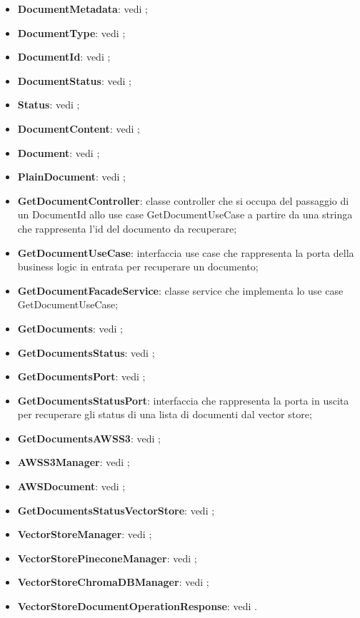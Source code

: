 \documentclass[10pt, a4paper]{article}
\begin{document}
\begin{itemize}
    \item \textbf{DocumentMetadata}: vedi ;
    \item \textbf{DocumentType}: vedi ;
    \item \textbf{DocumentId}: vedi ;
    \item \textbf{DocumentStatus}: vedi ;
    \item \textbf{Status}: vedi ;
    \item \textbf{DocumentContent}: vedi ;
    \item \textbf{Document}: vedi ;
    \item \textbf{PlainDocument}: vedi ;
    \item \label{GetDocumentController}\textbf{GetDocumentController}: classe controller che si occupa del passaggio di un DocumentId allo use case GetDocumentUseCase a partire da una stringa che rappresenta l'id del documento da recuperare;
    \item \label{GetDocumentUseCase}\textbf{GetDocumentUseCase}: interfaccia use case che rappresenta la porta della business logic in entrata per recuperare un documento;
    \item \label{GetDocumentFacadeService}\textbf{GetDocumentFacadeService}: classe service che implementa lo use case GetDocumentUseCase;
    \item \textbf{GetDocuments}: vedi ;
    \item \textbf{GetDocumentsStatus}: vedi ;
    \item \textbf{GetDocumentsPort}: vedi ;
    \item \label{GetDocumentsStatusPort}\textbf{GetDocumentsStatusPort}: interfaccia che rappresenta la porta in uscita per recuperare gli status di una lista di documenti dal vector store;
    \item \textbf{GetDocumentsAWSS3}: vedi ;
    \item \textbf{AWSS3Manager}: vedi ;
    \item \textbf{AWSDocument}: vedi ;
    \item \textbf{GetDocumentsStatusVectorStore}: vedi ;
    \item \textbf{VectorStoreManager}: vedi ;
    \item \textbf{VectorStorePineconeManager}: vedi ;
    \item \textbf{VectorStoreChromaDBManager}: vedi ;
    \item \textbf{VectorStoreDocumentOperationResponse}: vedi .
\end{itemize}
\end{document}
